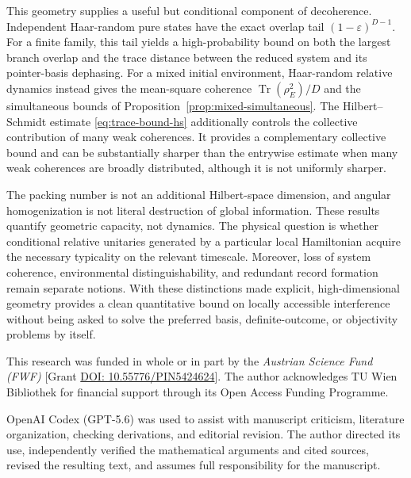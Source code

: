 \documentclass[aps,pra,reprint,superscriptaddress,nofootinbib,longbibliography]{revtex4-2}
\newcommand{\Tr}{\operatorname{Tr}}
\newcommand{\eps}{\varepsilon}
\begin{document}
This geometry supplies a useful but conditional component of decoherence.
Independent Haar-random pure states have the exact overlap tail
$(1-\eps)^{D-1}$.  For a finite family, this tail yields a
high-probability bound on both the largest branch overlap and the trace
distance between the reduced system and its pointer-basis dephasing.  For a
mixed initial environment, Haar-random relative dynamics instead gives the
mean-square coherence $\Tr(\rho_E^2)/D$ and the simultaneous bounds of
Proposition~\ref{prop:mixed-simultaneous}.  The Hilbert--Schmidt estimate
\eqref{eq:trace-bound-hs} additionally controls the collective contribution
of many weak coherences.  It provides a complementary collective bound and
can be substantially sharper than the entrywise estimate when many weak
coherences are broadly distributed, although it is not uniformly sharper.

The packing number is not an additional Hilbert-space dimension, and angular
homogenization is not literal destruction of global information.  These
results quantify geometric capacity, not dynamics.  The physical question is
whether conditional relative unitaries generated by a particular local
Hamiltonian acquire the necessary typicality on the relevant timescale.
Moreover, loss of system coherence, environmental distinguishability, and
redundant record formation remain separate notions.  With these distinctions
made explicit, high-dimensional geometry provides a clean quantitative bound
on locally accessible interference without being asked to solve the preferred
basis, definite-outcome, or objectivity problems by itself.

\begin{acknowledgments}
This research was funded in whole or in part by the \textit{Austrian Science
Fund (FWF)} [Grant
\href{https://doi.org/10.55776/PIN5424624}{DOI: 10.55776/PIN5424624}].
The author acknowledges TU Wien Bibliothek for financial support through its
Open Access Funding Programme.

OpenAI Codex (GPT-5.6) was used to assist with manuscript criticism, literature
organization, checking derivations, and editorial revision.  The author
directed its use, independently verified the mathematical arguments and cited
sources, revised the resulting text, and assumes full responsibility for the
manuscript.
\end{acknowledgments}


\end{document}
